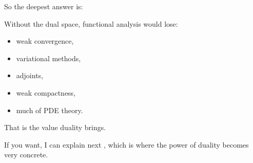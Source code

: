 \begin{description}
So the deepest answer is:

\> 

Without the dual space, functional analysis would lose:

	\begin{itemize}
    \item weak convergence,
    \item variational methods,
    \item adjoints,
    \item weak compactness,
    \item much of PDE theory.
	\end{itemize}

That is the value duality brings.

\end{description}

If you want, I can explain next , which is where the power of duality becomes very concrete.

